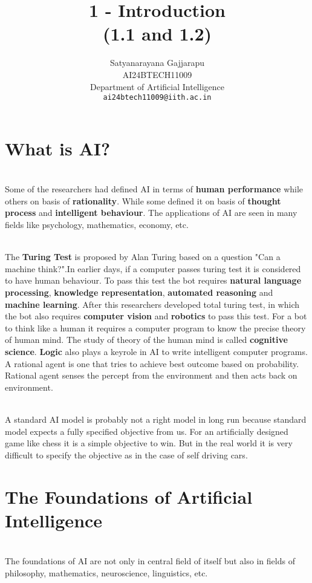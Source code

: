 \documentclass{article}
\title{1 - Introduction \\
(1.1 and 1.2)}
\author{%
Satyanarayana Gajjarapu \\
AI24BTECH11009 \\
Department of Artificial Intelligence \\
\texttt{ai24btech11009@iith.ac.in} \\
}
\begin{document}
\maketitle
\section{What is AI?}
\begin{paragraph}
\\
Some of the researchers had defined AI in terms of \textbf{human performance} while others on basis of \textbf{rationality}. While some defined it on basis of \textbf{thought process} and \textbf{intelligent behaviour}. The applications of AI are seen in many fields like psychology, mathematics, economy, etc.
\end{paragraph}
\begin{paragraph}
\\
The \textbf{Turing Test} is proposed by Alan Turing based on a question "Can a machine think?".In earlier days, if a computer passes turing test it is considered to have human behaviour. To pass this test the bot requires \textbf{natural language processing}, \textbf{knowledge representation}, \textbf{automated reasoning} and \textbf{machine learning}. After this researchers developed total turing test, in which the bot also requires \textbf{computer vision} and \textbf{robotics} to pass this test. For a bot to think like a human it requires a computer program to know the precise theory of human mind. The study of theory of the human mind is called \textbf{cognitive science}. \textbf{Logic} also plays a keyrole in AI to write intelligent computer programs. A rational agent is one that tries to achieve best outcome based on probability.  Rational agent senses the percept from the environment and then acts back on environment.
\end{paragraph}

\begin{paragraph}
\\
A standard AI model is probably not a right model in long run because standard model expects a fully specified objective from us. For an artificially designed game like chess it is a simple objective to win. But in the real world it is very difficult to specify the objective as in the case of self driving cars.
\end{paragraph}
\section{The Foundations of Artificial Intelligence}
\begin{paragraph}
\\
The foundations of AI are not only in central field of itself but also in fields of philosophy, mathematics, neuroscience, linguistics, etc.
\end{paragraph}
\end{document}
